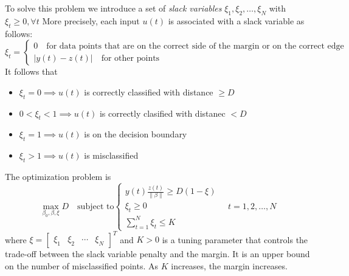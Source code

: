 \documentclass{book}
\begin{document}
To solve this problem we introduce a set of \emph{slack variables} $\xi_1,\xi_2,\dots,\xi_N$ with $\xi_t\geq0, \forall t$ More precisely, each input $u(t)$ is associated with a slack variable as follows:
\[
    \xi_t = \begin{cases}
        0 \quad \text{for data points that are on the correct side of the margin or on the correct edge of the margin}\\
        |y(t)-z(t)| \quad \text{for other points}
    \end{cases}
\]
It follows that 
\begin{itemize}
    \item $\xi_t=0 \implies u(t)$ is correctly classified with distance $\geq D$
    \item $0<\xi_t<1\implies u(t)$ is correctly clasified with distanec $<D$
    \item $\xi_t=1 \implies u(t)$ is on the decision boundary
    \item $\xi_t>1 \implies u(t)$ is misclassified
\end{itemize}
The optimization problem is 
\[
    \max_{\beta_0,\beta,\xi}D \quad \text{subject to} \begin{cases}
        y(t)\displaystyle\frac{z(t)}{\|\beta\|}\geq D(1-\xi)\\
        \xi_t\geq0\\
        \displaystyle\sum_{t=1}^{N}\xi_t\leq K
    \end{cases} \quad t=1,2,\dots,N
\]
where $\xi=\begin{bmatrix}
  \xi_1 & \xi_2 & \cdots & \xi_N
\end{bmatrix}^T$ and $K>0$ is a tuning parameter that controls the trade-off between the slack variable penalty and the margin. It is an upper bound on the number of misclassified points. As $K$ increases, the margin increases.
\end{document}
